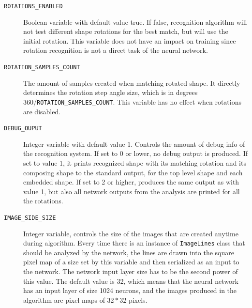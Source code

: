 \begin{description}
\item[\texttt{ROTATIONS\_ENABLED}] Boolean variable with default value true. If false, recognition algorithm will not test different shape rotations for the best match, but will use the initial rotation. This variable does not have an impact on training since rotation recognition is not a direct task of the neural network.

\item[\texttt{ROTATION\_SAMPLES\_COUNT}] The amount of samples created when matching rotated shape. It directly determines the rotation step angle size, which is in degrees 360/\texttt{ROTATION\_SAMPLES\_COUNT}. This variable has no effect when rotations are disabled.

\item[\texttt{DEBUG\_OUPUT}] Integer variable with default value 1. Controls the amount of debug info of the recognition system. If set to 0 or lower, no debug output is produced. If set to value 1, it prints recognized shape with its matching rotation and its composing shape to the standard output, for the top level shape and each embedded shape. If set to 2 or higher, produces the same output as with value 1, but also all network outputs from the analysis are printed for all the rotations.

\item[\texttt{IMAGE\_SIDE\_SIZE}] Integer variable, controls the size of the images that are created anytime during algorithm. Every time there is an instance of \texttt{ImageLines} class that should be analyzed by the network, the lines are drawn into the square pixel map of a size set by this variable and then serialized as an input to the network. The network input layer size has to be the second power of this value. The default value is 32, which means that the neural network has an input layer of size 1024 neurons, and the images produced in the algorithm are pixel maps of $32*32$ pixels.

\end{description}

